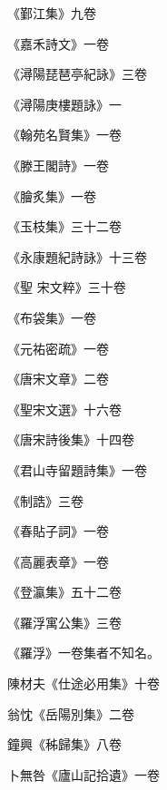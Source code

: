 \begin{pinyinscope}
 《鄞江集》九卷



 《嘉禾詩文》一卷



 《潯陽琵琶亭紀詠》三卷



 《潯陽庚樓題詠》一



 《翰苑名賢集》一卷



 《滕王閣詩》一卷



 《膾炙集》一卷



 《玉枝集》三十二卷



 《永康題紀詩詠》十三卷



 《聖
 宋文粹》三十卷



 《布袋集》一卷



 《元祐密疏》一卷



 《唐宋文章》二卷



 《聖宋文選》十六卷



 《唐宋詩後集》十四卷



 《君山寺留題詩集》一卷



 《制誥》三卷



 《春貼子詞》一卷



 《高麗表章》一卷



 《登瀛集》五十二卷



 《羅浮寓公集》三卷



 《羅浮》一卷集者不知名。



 陳材夫《仕途必用集》十卷



 翁忱《岳陽別集》二卷



 鐘興《秭歸集》八卷



 卜無咎《廬山記拾遺》一卷




\end{pinyinscope}
